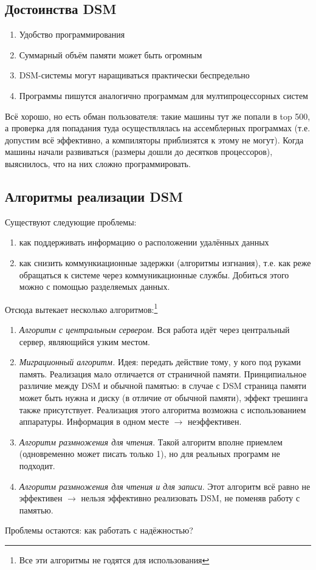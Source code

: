 \documentclass[a4paper,12pt]{article}
\begin{document}
	\subsection {\bf Достоинства DSM}
	\begin{enumerate}
		\item Удобство программирования
		\item Суммарный объём памяти может быть огромным
		\item DSM-системы могут наращиваться практически беспредельно
		\item Программы пишутся аналогично программам для мултипроцессорных систем
	\end{enumerate}
	Всё хорошо, но есть обман пользователя: такие машины тут же попали в top 500, а проверка
для попадания туда осуществлялась на ассемблерных программах (т.е. допустим всё эффективно, а
компиляторы приблизятся к этому не могут). Когда машины начали развиваться (размеры дошли до
десятков процессоров), выяснилось, что на них сложно программировать.

	\subsection {\bf Алгоритмы реализации DSM}
	Существуют следующие проблемы:
	\begin{enumerate}
		\item как поддерживать информацию о расположении удалённых данных
		\item как снизить коммункиационные задержки (алгоритмы изгнания), т.е. как реже
		обращаться к системе через коммуникационные службы. Добиться этого можно с помощью
		разделяемых данных.
	\end{enumerate}
	Отсюда вытекает несколько алгоритмов:\footnote{Все эти алгоритмы не годятся для 
использования}
	\begin{enumerate}
		\item {\em Алгоритм с центральным сервером.} Вся работа идёт через центральный сервер,
		являющийся узким местом.
		\item {\em Миграционный алгоритм.} Идея: передать действие тому, у кого под руками
		память. Реализация мало отличается от страничной памяти. Принципиальное различие между
		DSM и обычной памятью: в случае с DSM страница памяти может быть нужна и диску (в 
		отличие от обычной памяти), эффект трешинга также присутствует. Реализация этого
		алгоритма возможна с использованием аппаратуры. Информация в одном месте $\rightarrow$ 
		неэффективен.
		\item {\em Алгоритм размножения для чтения}. Такой алгоритм вполне приемлем 
		(одновременно может писать только 1), но для реальных программ не подходит.
		\item {\em Алгоритм размножения для чтения и для записи}. Этот алгоритм всё равно не
		эффективен $\rightarrow$ нельзя эффективно реализовать DSM, не поменяв работу с памятью.
	\end{enumerate}
	Проблемы остаются: как работать с надёжностью?
\end{document}

